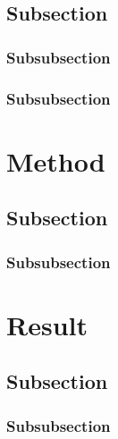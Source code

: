 \documentclass[../example.tex]{subfiles}
\begin{document}
\subsection{Subsection}
\lipsum[2]
\subsubsection{Subsubsection}
\lipsum[3]
\subsubsection{Subsubsection}
\lipsum[3]

\section{Method}
\lipsum[4]
\subsection{Subsection}
\lipsum[5]
\subsubsection{Subsubsection}
\lipsum[6]

\section{Result}
\lipsum[7]
\subsection{Subsection}
\lipsum[8]
\subsubsection{Subsubsection}
\lipsum[9]
\end{document}
